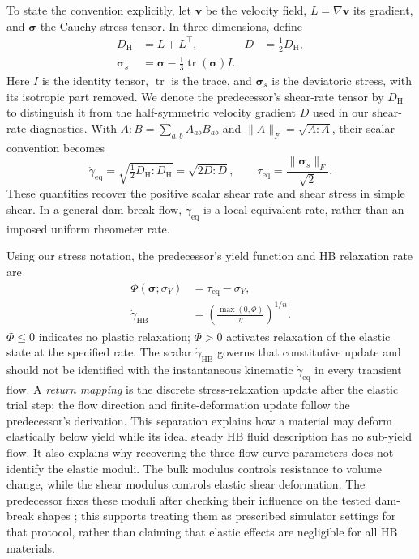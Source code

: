 To state the convention explicitly, let $\mathbf v$ be the velocity
field, $L=\nabla\mathbf v$ its gradient, and $\boldsymbol\sigma$ the
Cauchy stress tensor. In three dimensions, define
\begin{equation}
\label{eq:hb-tensor-convention}
\begin{aligned}
    D_{\mathrm H}&=L+L^\top, & D&=\tfrac12D_{\mathrm H},\\
    \boldsymbol\sigma_s
    &=\boldsymbol\sigma-\tfrac13\operatorname{tr}
      (\boldsymbol\sigma)I.
\end{aligned}
\end{equation}
Here $I$ is the identity tensor, $\operatorname{tr}$ is the trace,
and $\boldsymbol\sigma_s$ is the deviatoric stress, with its isotropic
part removed. We denote the predecessor's shear-rate tensor by
$D_{\mathrm H}$ to distinguish it from the half-symmetric velocity
gradient $D$ used in our shear-rate diagnostics. With
$A:B=\sum_{a,b}A_{ab}B_{ab}$ and
$\|A\|_F=\sqrt{A:A}$, their scalar convention becomes
\begin{equation}
\label{eq:hb-equivalent-scalars}
    \dot\gamma_{\mathrm{eq}}
    =\sqrt{\tfrac12 D_{\mathrm H}:D_{\mathrm H}}
    =\sqrt{2D:D},
    \qquad
    \tau_{\mathrm{eq}}=\frac{\|\boldsymbol\sigma_s\|_F}{\sqrt2}.
\end{equation}
These quantities recover the positive scalar shear rate and shear
stress in simple shear. In a general dam-break flow,
$\dot\gamma_{\mathrm{eq}}$ is a local equivalent rate, rather than
an imposed uniform rheometer rate.

Using our stress notation, the predecessor's yield function and HB
relaxation rate are~\cite[Sec.~4.3]{hamamichi2023nonnewtonian}
\begin{equation}
\label{eq:hb-yield-flow}
\begin{aligned}
    \Phi(\boldsymbol\sigma;\sigma_Y)&=\tau_{\mathrm{eq}}-\sigma_Y,\\
    \dot\gamma_{\mathrm{HB}}
    &=\left(\frac{\max(0,\Phi)}{\eta}\right)^{1/n}.
\end{aligned}
\end{equation}
$\Phi\leq0$ indicates no plastic relaxation; $\Phi>0$ activates
relaxation of the elastic state at the specified rate. The scalar
$\dot\gamma_{\mathrm{HB}}$ governs that constitutive update and
should not be identified with the instantaneous kinematic
$\dot\gamma_{\mathrm{eq}}$ in every transient flow. A \emph{return
mapping} is the discrete stress-relaxation update after the elastic
trial step; the flow direction and finite-deformation update follow
the predecessor's derivation. This separation explains how a material
may deform elastically below yield while its ideal steady HB fluid
description has no sub-yield flow. It also explains why recovering the
three flow-curve parameters does not identify the elastic moduli.
The bulk modulus controls resistance to volume change, while the shear
modulus controls elastic shear deformation. The predecessor fixes these
moduli after checking their influence on the tested dam-break shapes
\cite[Sec.~4.2]{hamamichi2023nonnewtonian}; this supports treating
them as prescribed simulator settings for that protocol, rather than
claiming that elastic effects are negligible for all HB materials.

